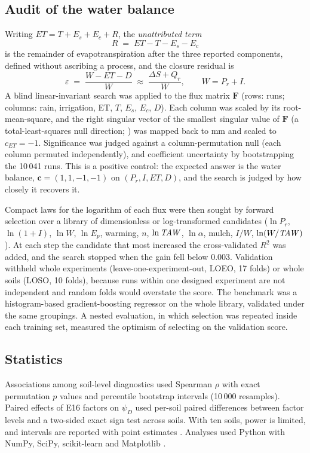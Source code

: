 \documentclass[review,12pt,authoryear]{elsarticle}
\begin{document}
\subsection{Audit of the water balance}
\label{sec:methodsB}
Writing $\mathit{ET}=T+E_s+E_c+R$, the \emph{unattributed term}
\begin{equation}
R \;=\; \mathit{ET}-T-E_s-E_c
\label{eq:R}
\end{equation}
is the remainder of evapotranspiration after the three reported components, defined without ascribing a process, and the closure residual is
\begin{equation}
\varepsilon \;=\; \frac{W-\mathit{ET}-D}{W}\;\approx\;\frac{\Delta S+Q_r}{W},\qquad W=P_r+I.
\label{eq:closure}
\end{equation}
A blind linear-invariant search was applied to the flux matrix $\mathbf F$ (rows: runs; columns: rain, irrigation, ET, $T$, $E_s$, $E_c$, $D$). Each column was scaled by its root-mean-square, and the right singular vector of the smallest singular value of $\mathbf F$ (a total-least-squares null direction; \citealt{Wold1987,Hastie2009}) was mapped back to mm and scaled to $c_{\mathit{ET}}=-1$. Significance was judged against a column-permutation null (each column permuted independently), and coefficient uncertainty by bootstrapping the 10\,041 runs. This is a positive control: the expected answer is the water balance, $\mathbf c=(1,1,-1,-1)$ on $(P_r,I,\mathit{ET},D)$, and the search is judged by how closely it recovers it.

Compact laws for the logarithm of each flux were then sought by forward selection \citep{Tibshirani1996,Hastie2009} over a library of dimensionless or log-transformed candidates ($\ln P_r$, $\ln(1+I)$, $\ln W$, $\ln E_p$, warming, $n$, $\ln\mathit{TAW}$, $\ln\alpha$, mulch, $I/W$, $\ln(W/\mathit{TAW})$). At each step the candidate that most increased the cross-validated $R^2$ was added, and the search stopped when the gain fell below 0.003. Validation withheld whole experiments (leave-one-experiment-out, LOEO, 17 folds) or whole soils (LOSO, 10 folds), because runs within one designed experiment are not independent and random folds would overstate the score. The benchmark was a histogram-based gradient-boosting regressor \citep{Friedman2001,Pedregosa2011} on the whole library, validated under the same groupings. A nested evaluation, in which selection was repeated inside each training set, measured the optimism of selecting on the validation score.

\subsection{Statistics}
Associations among soil-level diagnostics used Spearman $\rho$ with exact permutation $p$ values and percentile bootstrap intervals (10\,000 resamples). Paired effects of E16 factors on $\psi_D$ used per-soil paired differences between factor levels and a two-sided exact sign test across soils. With ten soils, power is limited, and intervals are reported with point estimates \citep{Efron1993,Good2005}. Analyses used Python with NumPy, SciPy, scikit-learn and Matplotlib \citep{Harris2020,Virtanen2020,Pedregosa2011,Hunter2007}.
\end{document}
